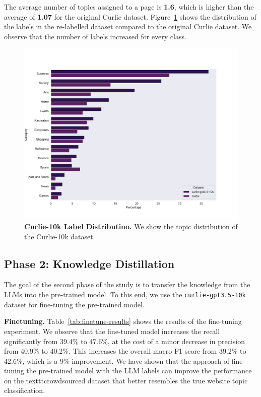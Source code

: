 The average number of topics assigned to a page is \textbf{1.6}, which is higher than the average of \textbf{1.07} for the original Curlie dataset. 
Figure~\ref{fig:label-distribution-comparison} shows the distribution of the labels in the re-labelled dataset compared to the original Curlie dataset.
We observe that the number of labels increased for every class.

\begin{figure}[!h]
    \centering
    \includegraphics[width=.8\columnwidth]{./figures/class_distribution_comparison.pdf}
    \caption{\textbf{Curlie-10k Label Distributino.} We show the topic distribution of the Curlie-10k dataset.}
    \label{fig:label-distribution-comparison}
\end{figure}


\subsection*{Phase 2: Knowledge Distillation}


The goal of the second phase of the study is to transfer the knowledge from the LLMs into the pre-trained model. 
To this end, we use the \texttt{curlie-gpt3.5-10k} dataset for fine-tuning the pre-trained model.


\textbf{Finetuning.} Table~\ref{tab:finetune-results} shows the results of the fine-tuning experiment. 
We observe that the fine-tuned model increases the recall significantly from 39.4\% to 47.6\%, at the cost of a minor decrease in precision from 40.9\% to 40.2\%. 
This increases the overall macro F1 score from 39.2\% to 42.6\%, which is a 9\% improvement. 
We have shown that the approach of fine-tuning the pre-trained model with the LLM labels can improve the performance on the texttt{crowdsourced} dataset that better resembles the true website topic classification.

